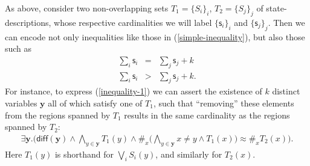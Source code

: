 \documentclass[12pt,oneside,reqno]{amsart}
\theoremstyle{definition}
\begin{document}
As above, consider two non-overlapping sets $T_1=\{S_i\}_i$, $T_2=\{S_j\}_j$ of state-descriptions, whose respective cardinalities we will label $\{\mathsf{s}_i\}_{i}$ and $\{\mathsf{s}_j\}_j$. Then we can encode not only inequalities like those in (\ref{simple-inequality}), but also those such as \begin{eqnarray}
    \sum_{i} \mathsf{s}_i & = & \sum_j \mathsf{s}_j + k \label{inequality-1} \\
    \sum_{i} \mathsf{s}_i & > & \sum_j \mathsf{s}_j + k. \label{inequality-2}
\end{eqnarray} For instance, to express (\ref{inequality-1}) we can assert the existence of $k$ distinct variables $\mathbf{y}$ all of which satisfy one of $T_1$, such that ``removing'' these elements from the regions spanned by $T_1$ results in the same cardinality as the regions spanned by $T_2$: \begin{eqnarray*}
\exists \mathbf{y}.\Big( \mathsf{diff}(\mathbf{y}) \wedge \bigwedge_{y \in \mathbf{y}} T_1(y) \wedge \#_x\big(\bigwedge_{y \in \mathbf{y}} x \neq y \wedge T_1(x)\big) \approx \#_xT_2(x)\Big).
\end{eqnarray*} Here $T_1(y)$ is shorthand for $\bigvee_i S_i(y)$, and similarly for $T_2(x)$. 
\end{document}
